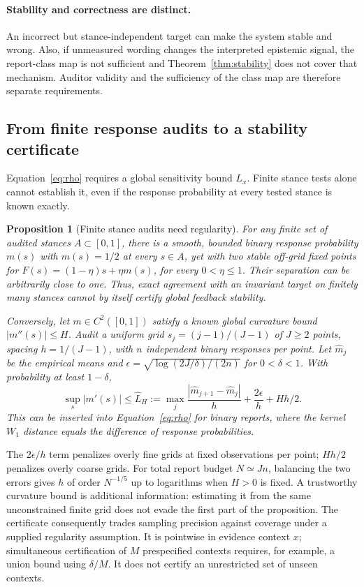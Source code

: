 \documentclass[10pt]{article}
\newtheorem{proposition}[theorem]{Proposition}
\begin{document}
\paragraph{Stability and correctness are distinct.}
An incorrect but stance-independent target can make the system stable and
wrong. Also, if unmeasured wording changes the interpreted epistemic signal,
the report-class map is not sufficient and Theorem~\ref{thm:stability} does not
cover that mechanism. Auditor validity and the sufficiency of the class
map are therefore separate requirements.

\subsection{From finite response audits to a stability certificate}
Equation~\eqref{eq:rho} requires a global sensitivity bound $L_x$.
Finite stance tests alone cannot establish it, even if the response
probability at every tested stance is known exactly.

\begin{proposition}[Finite stance audits need regularity]
\label{prop:finiteaudit}
For any finite set of audited stances $A\subset[0,1]$, there is a smooth,
bounded binary response probability $m(s)$ with $m(s)=1/2$ at every $s\in A$,
yet with two stable off-grid fixed points for
$F(s)=(1-\eta)s+\eta m(s)$, for every $0<\eta\le1$. Their separation can be
arbitrarily close to one. Thus, exact agreement with an invariant target on
finitely many stances cannot by itself certify global feedback stability.

Conversely, let $m\in C^2([0,1])$ satisfy a known global
curvature bound $|m''(s)|\le H$. Audit a uniform grid $s_j=(j-1)/(J-1)$ of $J\ge2$ points, spacing
$h=1/(J-1)$, with $n$ independent binary responses per point. Let
$\widehat m_j$ be the empirical means and
$\epsilon=\sqrt{\log(2J/\delta)/(2n)}$ for $0<\delta<1$.
With probability at least $1-\delta$,
\begin{equation}
 \sup_s|m'(s)|\le\widehat L_H:=
 \max_j\frac{|\widehat m_{j+1}-\widehat m_j|}{h}
       +\frac{2\epsilon}{h}+Hh/2.
 \label{eq:gridcertificate}
\end{equation}
This can be inserted into Equation~\eqref{eq:rho} for binary reports, where
the kernel $W_1$ distance equals the difference of response probabilities.
\end{proposition}

The $2\epsilon/h$ term penalizes overly fine grids at fixed observations per
point; $Hh/2$ penalizes overly coarse grids. For total report budget $N\simeq Jn$,
balancing the two errors gives $h$ of order $N^{-1/5}$ up to logarithms when
$H>0$ is fixed. A trustworthy curvature bound is additional information:
estimating it from the same unconstrained finite grid does not evade the first
part of the proposition. The certificate consequently trades sampling precision against coverage
under a supplied regularity assumption. It is pointwise in evidence context $x$; simultaneous certification of $M$ prespecified contexts requires, for example, a union bound using $\delta/M$. It does not certify an unrestricted set of unseen contexts.
\end{document}
